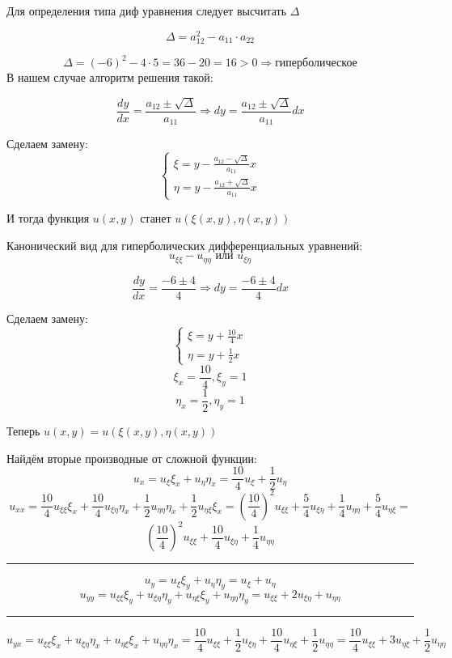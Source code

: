 \documentclass[a4paper,12pt]{article}
\begin{document}
	Для определения типа диф уравнения следует высчитать $\Delta$
	\begin{mdframed}
		\[
		\Delta = a_{12}^2 - a_{11}\cdot a_{22}
		\]
	\end{mdframed}
	\[
		\Delta = (-6)^2 - 4 \cdot 5 = 36 - 20 = 16 >0 \Rightarrow \text{гиперболическое}
	\]
	В нашем случае алгоритм решения такой:
	\begin{mdframed}
		\[
		\frac{d y}{d x} = \frac{a_{12} \pm \sqrt{\Delta}}{a_{11}} \Rightarrow dy = \frac{a_{12} \pm \sqrt{\Delta}}{a_{11}} dx
		\]
		
		Сделаем замену:
		\[
			\begin{cases}
				\xi = y - \frac{a_{12} - \sqrt{\Delta}}{a_{11}}x \\
				\eta  = y - \frac{a_{12} + \sqrt{\Delta}}{a_{11}}x 
			\end{cases}
		\]
		
		И тогда функция $u(x,y)$ станет $u(\xi(x,y), \eta(x,y))$
		
	Канонический вид для гиперболических дифференциальных уравнений:
	\[u_{\xi \xi} - u_{\eta \eta} \text{ или } u_{\xi \eta}\]
	\end{mdframed}
	
	\[
		\frac{dy}{dx} = \frac{-6 \pm 4}{4} \Rightarrow dy = \frac{-6 \pm 4}{4}dx
	\]
	
	Сделаем замену:
	\[
		\begin{cases}
			\xi = y + \frac{10}{4} x\\
			\eta = y + \frac{1}{2}x
		\end{cases} 
	\]
	\[\xi_x = \frac{10}{4}, \xi_y = 1\]
	\[\eta_x = \frac{1}{2}, \eta_y = 1\]
	
	Теперь  $u(x,y) = u(\xi(x,y), \eta(x,y))$
	
	Найдём вторые производные от сложной функции:
	\[
		u_x = u_\xi \xi_x + u_\eta \eta_x = \frac{10}{4}u_\xi  + \frac{1}{2}u_\eta 
	\]
	\[
		u_{xx} = \frac{10}{4}u_{\xi  \xi} \xi_x +\frac{10}{4}u_{\xi  \eta} \eta_x  + \frac{1}{2}u_{\eta \eta} \eta_x  + \frac{1}{2}u_{\eta \xi} \xi_x  = 
		\left(\frac{10}{4}\right)^2 u_{\xi  \xi}+\frac{5}{4}u_{\xi  \eta} + \frac{1}{4}u_{\eta \eta}+ \frac{5}{4}u_{\eta \xi} =
	\]
	\[
			\left(\frac{10}{4}\right)^2 u_{\xi  \xi}+\frac{10}{4}u_{\xi  \eta} + \frac{1}{4}u_{\eta \eta}
	\]
	\begin{center}
		\rule{0.8\linewidth}{1pt}
	\end{center}
	
	\[
		u_y = u_\xi \xi_y + u_\eta \eta_y = u_\xi + u_\eta
	\]
	\[
		u_{yy} =u_{\xi\xi} \xi_y  + u_{\xi\eta} \eta_y + u_{\eta\xi} \xi_y + u_{\eta\eta}\eta_y = u_{\xi\xi}   + 2u_{\xi\eta} + u_{\eta\eta}
	\]
		\begin{center}
		\rule{0.8\linewidth}{1pt}
	\end{center}
	\[
	u_{yx} = u_{\xi\xi} \xi_x  + u_{\xi\eta} \eta_x + u_{\eta\xi} \xi_x + u_{\eta\eta}\eta_x =  \frac{10}{4}u_{\xi\xi}   + \frac{1}{2}u_{\xi\eta} + \frac{10}{4}u_{\eta\xi} + \frac{1}{2}u_{\eta\eta} = \frac{10}{4}u_{\xi\xi}   +  3u_{\eta\xi} + \frac{1}{2}u_{\eta\eta}
	\]
	
\end{document}
